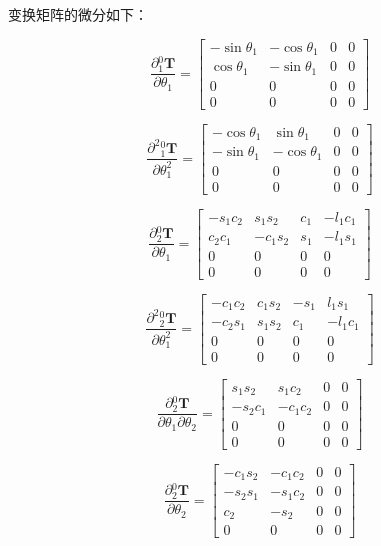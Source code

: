 \documentclass{homework}
\begin{document}
\begin{sol}
变换矩阵的微分如下：

\[
  \frac{\partial {_1^0}\mathbf{T}}{\partial \theta_1} =
  \begin{bmatrix}
    -\sin\theta_1 & -\cos\theta_1 & 0 & 0 \\
    \cos\theta_1 & -\sin\theta_1 & 0 & 0 \\
    0 & 0 & 0 & 0 \\
    0 & 0 & 0 & 0
  \end{bmatrix}
\]

\[
  \frac{\partial^2 {_1^0}\mathbf{T}}{\partial \theta_1^2} =
  \begin{bmatrix}
    -\cos\theta_1 & \sin\theta_1 & 0 & 0 \\
    -\sin\theta_1 & -\cos\theta_1 & 0 & 0 \\
    0 & 0 & 0 & 0 \\
    0 & 0 & 0 & 0
  \end{bmatrix}
\]

\[
  \frac{\partial {_2^0}\mathbf{T}}{\partial \theta_1} =
  \begin{bmatrix} 
    -s_{1} c_{2} & s_{1} s_{2} & c_{1} & -l_{1} c_{1} \\ 
    c_{2} c_{1} & -c_{1} s_{2} & s_{1} & -l_{1} s_{1} \\ 
    0 & 0 & 0 & 0 \\ 
    0 & 0 & 0 & 0
  \end{bmatrix}
\]

\[
  \frac{\partial^2 {_2^0}\mathbf{T}}{\partial \theta_1^2} =
  \begin{bmatrix} 
    -c_{1} c_{2} & c_{1} s_{2} & -s_{1} & l_{1} s_{1} \\ 
    -c_{2} s_{1} & s_{1} s_{2} & c_{1} & -l_{1} c_{1} \\ 
    0 & 0 & 0 & 0 \\ 
    0 & 0 & 0 & 0
  \end{bmatrix}
\]

\[
  \frac{\partial {_2^0}\mathbf{T}}{\partial \theta_1 \partial \theta_2} =
  \begin{bmatrix} 
    s_{1} s_{2} & s_{1} c_{2} & 0 & 0 \\ 
    -s_{2} c_{1} & -c_{1} c_{2} & 0 & 0 \\ 
    0 & 0 & 0 & 0 \\ 
    0 & 0 & 0 & 0
  \end{bmatrix}
\]

\[
  \frac{\partial {_2^0}\mathbf{T}}{\partial \theta_2} =
  \begin{bmatrix} 
    -c_{1} s_{2} & -c_{1} c_{2} & 0 & 0 \\ 
    -s_{2} s_{1} & -s_{1} c_{2} & 0 & 0 \\ 
    c_{2} & -s_{2} & 0 & 0 \\ 
    0 & 0 & 0 & 0
  \end{bmatrix}
\]


\end{sol}
\end{document}
